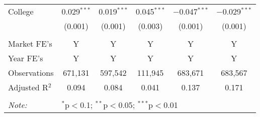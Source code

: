 \begin{table}[!htbp]
\begin{tabular}{@{\extracolsep{5pt}}lccccc}
  College & 0.029$^{***}$ & 0.019$^{***}$ & 0.045$^{***}$ & $-$0.047$^{***}$ & $-$0.029$^{***}$ \\ 
  & (0.001) & (0.001) & (0.003) & (0.001) & (0.001) \\ 
 \hline \\[-1.8ex] 
Market FE's & Y & Y & Y & Y & Y \\ 
Year FE's & Y & Y & Y & Y & Y \\ 
Observations & 671,131 & 597,542 & 111,945 & 683,671 & 683,567 \\ 
Adjusted R$^{2}$ & 0.094 & 0.084 & 0.041 & 0.137 & 0.171 \\ 
\hline 
\hline \\[-1.8ex] 
\textit{Note:}  & \multicolumn{5}{l}{$^{*}$p$<$0.1; $^{**}$p$<$0.05; $^{***}$p$<$0.01} \\ 
\end{tabular} 
\end{table} 
